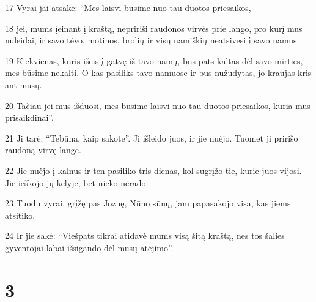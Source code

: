 \par 17 Vyrai jai atsakė: “Mes laisvi būsime nuo tau duotos priesaikos, 
\par 18 jei, mums įeinant į kraštą, nepririši raudonos virvės prie lango, pro kurį mus nuleidai, ir savo tėvo, motinos, brolių ir visų namiškių neatsivesi į savo namus. 
\par 19 Kiekvienas, kuris išeis į gatvę iš tavo namų, bus pats kaltas dėl savo mirties, mes būsime nekalti. O kas pasiliks tavo namuose ir bus nužudytas, jo kraujas kris ant mūsų. 
\par 20 Tačiau jei mus išduosi, mes būsime laisvi nuo tau duotos priesaikos, kuria mus prisaikdinai”. 
\par 21 Ji tarė: “Tebūna, kaip sakote”. Ji išleido juos, ir jie nuėjo. Tuomet ji pririšo raudoną virvę lange. 
\par 22 Jie nuėjo į kalnus ir ten pasiliko tris dienas, kol sugrįžo tie, kurie juos vijosi. Jie ieškojo jų kelyje, bet nieko nerado. 
\par 23 Tuodu vyrai, grįžę pas Jozuę, Nūno sūnų, jam papasakojo visa, kas jiems atsitiko. 
\par 24 Ir jie sakė: “Viešpats tikrai atidavė mums visą šitą kraštą, nes tos šalies gyventojai labai išsigando dėl mūsų atėjimo”.



\chapter{3}


